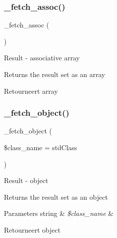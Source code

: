 \subsubsection{\texorpdfstring{\_fetch\_assoc()}{\_fetch\_assoc()}}
{\footnotesize\ttfamily \+\_\+fetch\+\_\+assoc (\begin{DoxyParamCaption}{ }\end{DoxyParamCaption})\hspace{0.3cm}{\ttfamily [protected]}}

Result -\/ associative array

Returns the result set as an array

\begin{DoxyReturn}{Retourneert}
array 
\end{DoxyReturn}
\mbox{\label{class_c_i___d_b__sqlsrv__result_a60806be6a9c2488820813c2a7f4fef71}} 
\subsubsection{\texorpdfstring{\_fetch\_object()}{\_fetch\_object()}}
{\footnotesize\ttfamily \+\_\+fetch\+\_\+object (\begin{DoxyParamCaption}\item[{}]{\$class\+\_\+name = {\ttfamily \textquotesingle{}stdClass\textquotesingle{}} }\end{DoxyParamCaption})\hspace{0.3cm}{\ttfamily [protected]}}

Result -\/ object

Returns the result set as an object


\begin{DoxyParams}[1]{Parameters}
string & {\em \$class\+\_\+name} & \\
\hline
\end{DoxyParams}
\begin{DoxyReturn}{Retourneert}
object 
\end{DoxyReturn}
\mbox{\label{class_c_i___d_b__sqlsrv__result_a84bffd65e53902ade1591716749a33e3}} 
